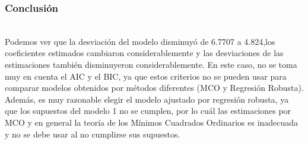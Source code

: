 \documentclass[12pt]{beamer}
\begin{document}
\begin{frame}
\frametitle{Conclusión}
~\\Podemos ver que la desviación del modelo disminuyó de 6.7707 a 4.824,los coeficientes estimados cambiaron considerablemente y las desviaciones de las estimaciones también disminuyeron considerablemente. En este caso, no se toma muy en cuenta el AIC y el BIC, ya que estos criterios no se pueden usar para comparar modelos obtenidos por métodos diferentes (MCO y Regresión Robusta). Además, es muy razonable elegir el modelo ajustado por regresión robusta, ya que los supuestos del modelo 1 no se cumplen, por lo cuál las estimaciones por MCO y en general la teoría de los Mínimos Cuadrados Ordinarios es inadecuada y no se debe usar al no cumplirse sus supuestos. 
\end{frame}
\end{document}
